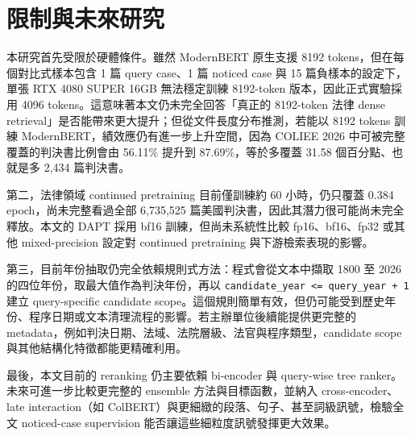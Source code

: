 \section{限制與未來研究}

本研究首先受限於硬體條件。雖然 ModernBERT 原生支援 8192 tokens，但在每個對比式樣本包含 1 篇 query case、1 篇 noticed case 與 15 篇負樣本的設定下，單張 RTX 4080 SUPER 16GB 無法穩定訓練 8192-token 版本，因此正式實驗採用 4096 tokens。這意味著本文仍未完全回答「真正的 8192-token 法律 dense retrieval」是否能帶來更大提升；但從文件長度分布推測，若能以 8192 tokens 訓練 ModernBERT，績效應仍有進一步上升空間，因為 COLIEE 2026 中可被完整覆蓋的判決書比例會由 56.11\% 提升到 87.69\%，等於多覆蓋 31.58 個百分點、也就是多 2,434 篇判決書。

第二，法律領域 continued pretraining 目前僅訓練約 60 小時，仍只覆蓋 0.384 epoch，尚未完整看過全部 6,735,525 篇美國判決書，因此其潛力很可能尚未完全釋放。本文的 DAPT 採用 bf16 訓練，但尚未系統性比較 fp16、bf16、fp32 或其他 mixed-precision 設定對 continued pretraining 與下游檢索表現的影響。

第三，目前年份抽取仍完全依賴規則式方法：程式會從文本中擷取 1800 至 2026 的四位年份，取最大值作為判決年份，再以 \texttt{candidate\_year <= query\_year + 1} 建立 query-specific candidate scope。這個規則簡單有效，但仍可能受到歷史年份、程序日期或文本清理流程的影響。若主辦單位後續能提供更完整的 metadata，例如判決日期、法域、法院層級、法官與程序類型，candidate scope 與其他結構化特徵都能更精確利用。

最後，本文目前的 reranking 仍主要依賴 bi-encoder 與 query-wise tree ranker。未來可進一步比較更完整的 ensemble 方法與目標函數，並納入 cross-encoder、late interaction（如 ColBERT）與更細緻的段落、句子、甚至詞級訊號，檢驗全文 noticed-case supervision 能否讓這些細粒度訊號發揮更大效果。
